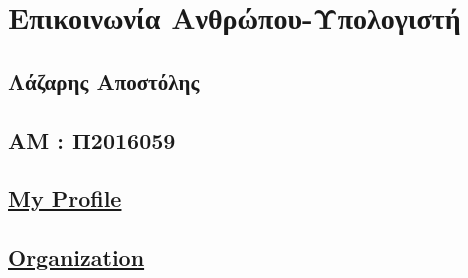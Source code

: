 \hypertarget{ux3b5ux3c0ux3b9ux3baux3bfux3b9ux3bdux3c9ux3bdux3afux3b1-ux3b1ux3bdux3b8ux3c1ux3ceux3c0ux3bfux3c5-ux3c5ux3c0ux3bfux3bbux3bfux3b3ux3b9ux3c3ux3c4ux3ae}{%
\section{Επικοινωνία
Ανθρώπου-Υπολογιστή}\label{ux3b5ux3c0ux3b9ux3baux3bfux3b9ux3bdux3c9ux3bdux3afux3b1-ux3b1ux3bdux3b8ux3c1ux3ceux3c0ux3bfux3c5-ux3c5ux3c0ux3bfux3bbux3bfux3b3ux3b9ux3c3ux3c4ux3ae}}

\hypertarget{ux3bbux3acux3b6ux3b1ux3c1ux3b7ux3c2-ux3b1ux3c0ux3bfux3c3ux3c4ux3ccux3bbux3b7ux3c2}{%
\subsection{Λάζαρης
Αποστόλης}\label{ux3bbux3acux3b6ux3b1ux3c1ux3b7ux3c2-ux3b1ux3c0ux3bfux3c3ux3c4ux3ccux3bbux3b7ux3c2}}

\hypertarget{ux3b1ux3bc-ux3c02016059}{%
\subsection{ΑΜ : Π2016059}\label{ux3b1ux3bc-ux3c02016059}}

\hypertarget{my-profile}{%
\subsection{\texorpdfstring{\href{https://github.com/ApoLaz}{My
Profile}}{My Profile}}\label{my-profile}}

\hypertarget{organization}{%
\subsection{\texorpdfstring{\href{https://github.com/Unixidized/Unixidized}{Organization}}{Organization}}\label{organization}}

